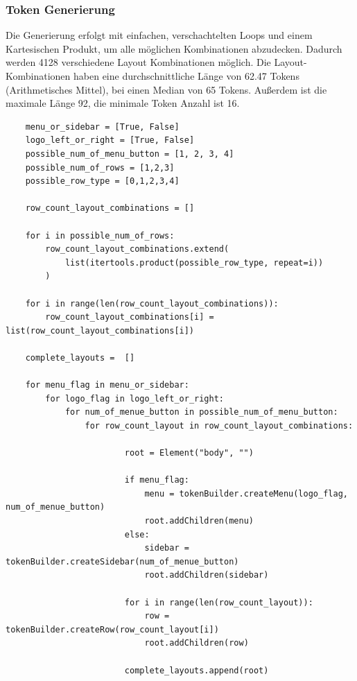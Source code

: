 \documentclass[pdftex,a4paper,halfparskip, article]{scrartcl}
\begin{document}
\subsubsection{Token Generierung}

Die Generierung erfolgt mit einfachen, verschachtelten Loops und einem Kartesischen Produkt, um alle möglichen Kombinationen abzudecken. Dadurch werden 4128 verschiedene Layout Kombinationen möglich. 
Die Layout-Kombinationen haben eine durchschnittliche Länge von 62.47 Tokens (Arithmetisches Mittel), bei einen Median von 65 Tokens. Außerdem ist die maximale Länge 92, die minimale Token Anzahl ist 16.

\begin{verbatim}
    menu_or_sidebar = [True, False]
    logo_left_or_right = [True, False]
    possible_num_of_menu_button = [1, 2, 3, 4]
    possible_num_of_rows = [1,2,3]
    possible_row_type = [0,1,2,3,4]

    row_count_layout_combinations = []

    for i in possible_num_of_rows:
        row_count_layout_combinations.extend( 
            list(itertools.product(possible_row_type, repeat=i))
        )

    for i in range(len(row_count_layout_combinations)):
        row_count_layout_combinations[i] = list(row_count_layout_combinations[i])

    complete_layouts =  []

    for menu_flag in menu_or_sidebar:
        for logo_flag in logo_left_or_right:
            for num_of_menue_button in possible_num_of_menu_button:
                for row_count_layout in row_count_layout_combinations:

                        root = Element("body", "")

                        if menu_flag:
                            menu = tokenBuilder.createMenu(logo_flag, num_of_menue_button)
                            root.addChildren(menu)
                        else:
                            sidebar = tokenBuilder.createSidebar(num_of_menue_button)
                            root.addChildren(sidebar)

                        for i in range(len(row_count_layout)):
                            row = tokenBuilder.createRow(row_count_layout[i])
                            root.addChildren(row)

                        complete_layouts.append(root)
\end{verbatim}
\end{document}
